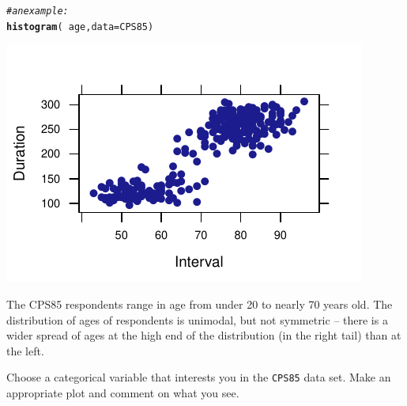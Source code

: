 \documentclass[twoside]{book}\usepackage[]{graphicx}\usepackage[]{xcolor}
\makeatletter
\def\maxwidth{ %
  \ifdim\Gin@nat@width>\linewidth
    \linewidth
  \else
    \Gin@nat@width
  \fi
}
\newcommand{\hlcom}[1]{\textcolor[rgb]{0.678,0.584,0.686}{\textit{#1}}}%
\newcommand{\hlopt}[1]{\textcolor[rgb]{0,0,0}{#1}}%
\newcommand{\hlstd}[1]{\textcolor[rgb]{0.345,0.345,0.345}{#1}}%
\newcommand{\hlkwc}[1]{\textcolor[rgb]{0.333,0.667,0.333}{#1}}%
\newcommand{\hlkwd}[1]{\textcolor[rgb]{0.737,0.353,0.396}{\textbf{#1}}}%
\newenvironment{kframe}{%
 \def\at@end@of@kframe{}%
 \ifinner\ifhmode%
  \def\at@end@of@kframe{\end{minipage}}%
  \begin{minipage}{\columnwidth}%
 \fi\fi%
 \def\FrameCommand##1{\hskip\@totalleftmargin \hskip-\fboxsep
 \colorbox{shadecolor}{##1}\hskip-\fboxsep
     \hskip-\linewidth \hskip-\@totalleftmargin \hskip\columnwidth}%
 \MakeFramed {\advance\hsize-\width
   \@totalleftmargin\z@ \linewidth\hsize
   \@setminipage}}%
 {\par\unskip\endMakeFramed%
 \at@end@of@kframe}
\newenvironment{knitrout}{}{} %
\newcommand{\Rindex}[1]{\index{\texttt{#1}}}
\newcommand{\dataframe}[1]{{\color{blue!80!black}\texttt{#1}}\Rindex{#1}}
\newcounter{example}[section]
\makeatother
\begin{document}
\begin{solution}
\begin{knitrout}
\color{fgcolor}\begin{kframe}
\begin{alltt}
\hlcom{# an example:}
\hlkwd{histogram}\hlstd{(}\hlopt{~}\hlstd{age,} \hlkwc{data} \hlstd{= CPS85)}
\end{alltt}
\end{kframe}

{\centering \includegraphics[width=\maxwidth]{figures/fig-unnamed-chunk-19-1} 

}



\end{knitrout}
The CPS85 respondents range in age from under 20 to nearly 70 years old.  The distribution of ages of respondents is unimodal, but not symmetric -- there is a wider spread of ages at the high end of the distribution (in the right tail) than at the left. 
\end{solution}

\begin{problem}
	Choose a categorical variable that interests you in the \dataframe{CPS85}
	data set.  Make an appropriate plot and comment on what you see.
\end{problem}
\end{document}
